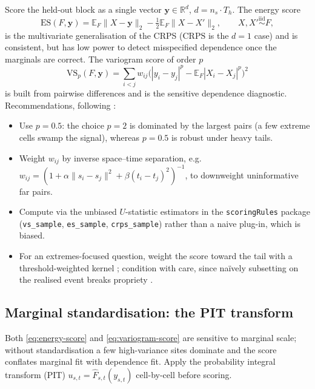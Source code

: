 \documentclass[11pt]{article}
\theoremstyle{definition}
\newcommand{\R}{\mathbb{R}}
\newcommand{\E}{\mathbb{E}}
\begin{document}
Score the held-out block as a single vector
$\bm y\in\R^{d}$, $d = n_s\cdot T_h$. The energy score
\cite{gneiting2007}
\begin{equation}
  \mathrm{ES}(F, \bm y)
    = \E_F \|X - \bm y\|_2 - \tfrac12 \E_F \|X - X'\|_2,
  \qquad X, X' \overset{\text{iid}}{\sim} F,
  \label{eq:energy-score}
\end{equation}
is the multivariate generalisation of the CRPS ($\mathrm{CRPS}$ is the
$d=1$ case) and is consistent, but has low power to detect misspecified
dependence once the marginals are correct. The variogram score of
order $p$ \cite{scheuerer2015}
\begin{equation}
  \mathrm{VS}_p(F, \bm y)
    = \sum_{i<j} w_{ij}
      \big( |y_i - y_j|^p - \E_F |X_i - X_j|^p \big)^2
  \label{eq:variogram-score}
\end{equation}
is built from pairwise differences and is the sensitive dependence
diagnostic. Recommendations, following \cite{scheuerer2015,
jordan2019}:
\begin{itemize}[leftmargin=1.6em, itemsep=2pt]
  \item Use $p=0.5$: the choice $p=2$ is dominated by the largest
        pairs (a few extreme cells swamp the signal), whereas $p=0.5$
        is robust under heavy tails.
  \item Weight $w_{ij}$ by inverse space--time separation, e.g.\
        $w_{ij} = (1 + \alpha\|s_i-s_j\|^2 + \beta(t_i-t_j)^2)^{-1}$,
        to downweight uninformative far pairs.
  \item Compute via the unbiased $U$-statistic estimators in the
        \texttt{scoringRules} package (\texttt{vs\_sample},
        \texttt{es\_sample}, \texttt{crps\_sample}) \cite{jordan2019}
        rather than a naive plug-in, which is biased.
  \item For an extremes-focused question, weight the score toward the
        tail with a threshold-weighted kernel \cite{allen2023}; condition
        with care, since na\"ively subsetting on the realised event
        breaks propriety \cite{lerch2017, diks2011}.
\end{itemize}

\subsection{Marginal standardisation: the PIT transform}
\label{subsec:pit}

Both \eqref{eq:energy-score} and \eqref{eq:variogram-score} are
sensitive to marginal scale; without standardisation a few
high-variance sites dominate and the score conflates marginal fit with
dependence fit. Apply the probability integral transform (PIT)
$u_{s,t} = \hat F_{s,t}(y_{s,t})$ cell-by-cell before scoring.
\end{document}
